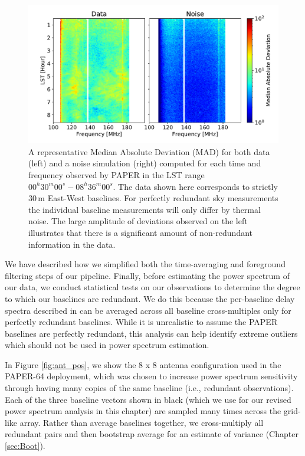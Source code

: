 \begin{figure}[tp]
	\centering
	\includegraphics[width=.85\textwidth]{plots/data_noise_mad_O.pdf}
	\caption{A representative Median Absolute Deviation (MAD) for both data (left)
		and a noise simulation (right) computed for each time and frequency observed by
		PAPER in the LST range $00^{h}30^{m}00^{s} - 08^{h}36^{m}00^{s}$.
    The data shown here corresponds to
		strictly 30\,m East-West baselines.
		For perfectly redundant sky measurements the individual
		baseline measurements will only differ by thermal noise.
		The large amplitude of deviations observed on the left
		illustrates that there is a significant
		amount of non-redundant information in the data.}\label{fig:mad}
\end{figure}

We have described how we simplified both the time-averaging and foreground filtering steps of our pipeline. Finally, before estimating the power spectrum of our data, we conduct statistical tests on our observations to determine the degree to which
our baselines are redundant.
We do this because the per-baseline delay spectra described in \citet{parsons_et_al2012b}
can be averaged across all baseline cross-multiples only for
perfectly redundant baselines. While it is unrealistic to assume
the PAPER baselines are perfectly redundant, this analysis can
help identify extreme outliers which should not be used in
power spectrum estimation.

In Figure \ref{fig:ant_pos}, we show the 8 x 8 antenna configuration used in the PAPER-64 deployment, which was chosen to increase power spectrum sensitivity through having many copies of the same baseline (i.e., redundant observations). Each of the three baseline vectors shown in black (which we use for our revised power spectrum analysis in this chapter) are
sampled many times across the grid-like array. Rather than average
baselines together,
we cross-multiply all redundant pairs and then bootstrap average for
an estimate of variance (Chapter \ref{sec:Boot}). 

